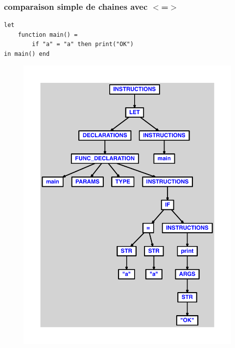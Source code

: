 \documentclass{article}
\begin{document}
\subsubsection{comparaison simple de chaines avec $ < $=$ > $}
\begin{lstlisting}
let
	function main() =
		if "a" = "a" then print("OK")
in main() end
\end{lstlisting}
\newpage
\begin{figure}[H]
\centering
\includegraphics[max width=\textwidth]{ast/ast_179.pdf}
\end{figure}
\newpage
\end{document}

